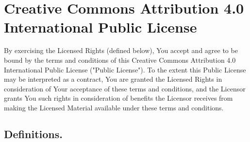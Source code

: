 \section{Creative Commons Attribution 4.0 International Public License}
  By exercising the Licensed Rights (defined below), You accept and agree to be bound by the terms and conditions of this
  Creative Commons Attribution 4.0 International Public License ("Public License"). To the extent this Public License may be
  interpreted as a contract, You are granted the Licensed Rights in consideration of Your acceptance of these terms and
  conditions, and the Licensor grants You such rights in consideration of benefits the Licensor receives from making the
  Licensed Material available under these terms and conditions.

  \subsection{Definitions.}

